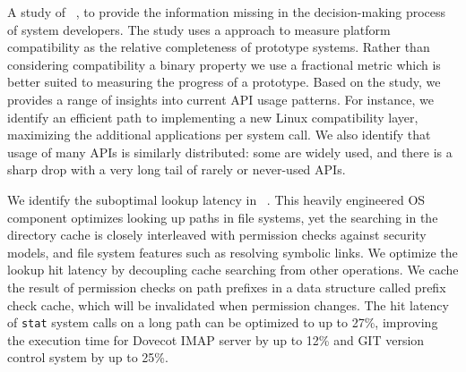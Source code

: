 \begin{compactitem}
\item
A study of ~\citep{tsai16apistudy}, to provide the information missing in
the decision-making process of system developers.
The study uses
a approach to measure platform compatibility as the relative completeness of prototype systems.
Rather than considering compatibility a binary property %
we use a fractional metric
which is better suited to measuring the progress of a prototype.
Based on the study,
we provides a range of insights into current API usage patterns.
For instance, we identify an efficient path to implementing a new Linux compatibility layer, maximizing the additional applications per system call.
We also identify
that usage of many APIs is similarly distributed:
some are widely used, and there is a sharp drop with a very long tail
of rarely or never-used APIs.


\item
We identify the suboptimal lookup latency in 
~\citep{tsai15dcache}.
This heavily engineered OS component
optimizes looking up paths in file systems,
yet the searching in the directory cache is closely interleaved
with permission checks against security models,
and file system features such as resolving symbolic links.
We optimize the lookup hit latency by decoupling cache searching
from other operations.
We cache the result of permission checks on path prefixes in a data structure
called prefix check cache,
which will be invalidated when permission changes.
The hit latency of {\tt stat} system calls on a long path
can be optimized to up to 27\%,
improving the execution time
for Dovecot IMAP server by up to 12\%
and GIT version control system by up to 25\%.


\end{compactitem}




